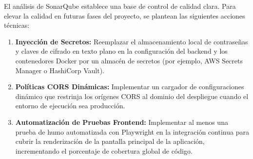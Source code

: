 El análisis de SonarQube establece una base de control de calidad clara. Para elevar la calidad en futuras fases del proyecto, se plantean las siguientes acciones técnicas:
\begin{enumerate}
  \item \textbf{Inyección de Secretos:} Reemplazar el almacenamiento local de contraseñas y claves de cifrado en texto plano en la configuración del backend y los contenedores Docker por un almacén de secretos (por ejemplo, AWS Secrets Manager o HashiCorp Vault).
  \item \textbf{Políticas CORS Dinámicas:} Implementar un cargador de configuraciones dinámico que restrinja los orígenes CORS al dominio del despliegue cuando el entorno de ejecución sea producción.
  \item \textbf{Automatización de Pruebas Frontend:} Implementar al menos una prueba de humo automatizada con Playwright en la integración continua para cubrir la renderización de la pantalla principal de la aplicación, incrementando el porcentaje de cobertura global de código.
\end{enumerate}

\vfill
